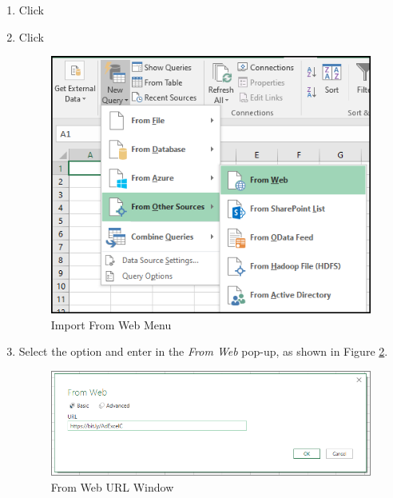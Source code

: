\begin{enumbox}
	\begin{enumerate}
		\item {} Click 
		\item {} Click 
	
		\begin{figure}[H]
			\centering
			\includegraphics[width=\maxwidth{.75\linewidth}]{gfx/ch07_fig01}
			\caption{Import From Web Menu}
			\label{07:fig01}
		\end{figure}
	
		\item Select the  option and enter  in the \textit{From Web} pop-up, as shown in Figure \ref{07:fig02a}.
	
		\begin{figure}[H]
			\centering
			\includegraphics[width=\maxwidth{.95\linewidth}]{gfx/ch07_fig02a}
			\caption{From Web URL Window}
			\label{07:fig02a}
		\end{figure}
	

\end{enumerate}
\end{enumbox}
